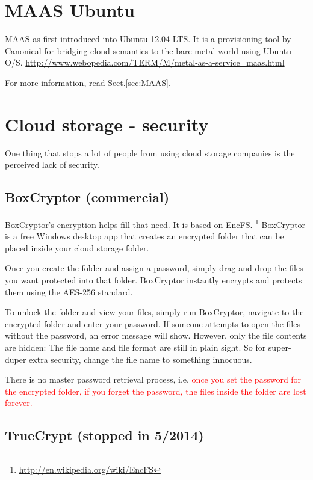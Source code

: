 \section{MAAS Ubuntu}
 \label{sec:Maas_Ubuntu}

 
MAAS as first introduced into Ubuntu 12.04 LTS. It is a provisioning tool by
Canonical for bridging cloud semantics to the bare metal world using Ubuntu
O/S. \url{http://www.webopedia.com/TERM/M/metal-as-a-service_maas.html}

For more information, read Sect.\ref{sec:MAAS}.

\section{Cloud storage - security}

One thing that stops a lot of people from using cloud storage companies is the
perceived lack of security. 

\subsection{BoxCryptor (commercial)}

BoxCryptor's encryption helps fill that need. It is based on EncFS.
\footnote{\url{http://en.wikipedia.org/wiki/EncFS}} BoxCryptor is a free Windows
desktop app that creates an encrypted folder that can be placed inside your cloud storage folder.

Once you create the folder and assign a password, simply drag and drop the files
you want protected into that folder. BoxCryptor instantly encrypts and protects
them using the AES-256 standard. 

To unlock the folder and view your files, simply run BoxCryptor, navigate to the
encrypted folder and enter your password. If someone attempts to open the files without the password, an error message
will show. However, only the file contents are hidden: The file name and file
format are still in plain sight. So for super-duper extra security, change the
file name to something innocuous.

There is no master password retrieval process, i.e. \textcolor{red}{once you set
the password for the encrypted folder, if you forget the password, the files
inside the folder are lost forever.}
  
  
\subsection{TrueCrypt (stopped in 5/2014)}

